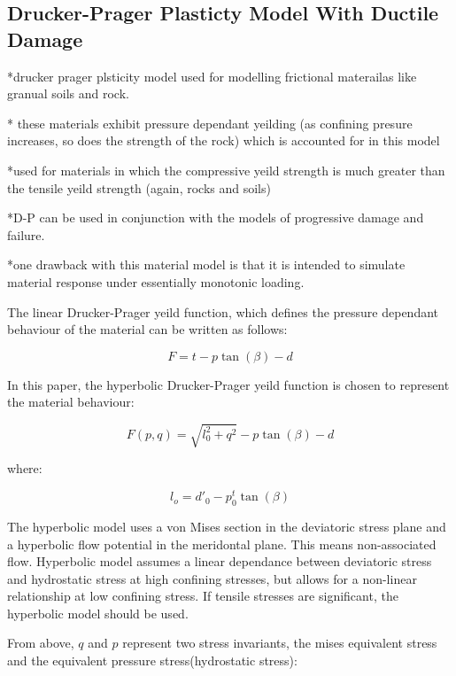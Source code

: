 \subsection{Drucker-Prager Plasticty Model With Ductile Damage}

{*}drucker prager plsticity model used for modelling frictional materailas
like granual soils and rock.

{*} these materials exhibit pressure dependant yeilding (as confining
presure increases, so does the strength of the rock) which is accounted
for in this model

{*}used for materials in which the compressive yeild strength is much
greater than the tensile yeild strength (again, rocks and soils)

{*}D-P can be used in conjunction with the models of progressive damage
and failure.

{*}one drawback with this material model is that it is intended to
simulate material response under essentially monotonic loading. 

The linear Drucker-Prager yeild function, which defines the pressure
dependant behaviour of the material can be written as follows:

\begin{equation}
F=t-p\tan\left(\beta\right)-d\label{eqn:druc1}
\end{equation}


In this paper, the hyperbolic Drucker-Prager yeild function is chosen
to represent the material behaviour:

\begin{equation}
F\left(p,q\right)=\sqrt{l_{0}^{2}+q^{2}}-p\tan\left(\beta\right)-d\label{eqn:druc2}
\end{equation}


where:

\begin{equation}
l_{o}=d'_{0}-p_{0}^{t}\tan\left(\beta\right)\label{eqn:druc2-1}
\end{equation}


The hyperbolic model uses a von Mises section in the deviatoric stress
plane and a hyperbolic flow potential in the meridontal plane. This
means non-associated flow. Hyperbolic model assumes a linear dependance
between deviatoric stress and hydrostatic stress at high confining
stresses, but allows for a non-linear relationship at low confining
stress. If tensile stresses are significant, the hyperbolic model
should be used.

From above, $q$ and $p$ represent two stress invariants, the mises
equivalent stress and the equivalent pressure stress(hydrostatic stress):

